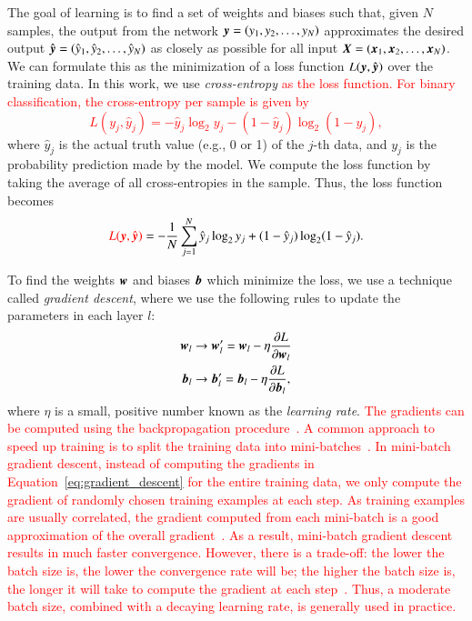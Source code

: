 \documentclass[fleqn,usenatbib]{mnras}
\newcommand{\eg}{{e.g., }}
\newcommand{\changed}[1]{\textcolor{red}{#1}}
\begin{document}
The goal of learning is to find a set of weights and biases such that,
given $N$ samples, the output from the network
$\bmath{y}=\left(y_1, y_2, \dots, y_N \right)$ approximates the desired output
$\hat{\bmath{y}}=\left(\hat{y}_1, \hat{y}_2, \dots, \hat{y}_N \right)$
as closely as possible for all input
$\bmath{X}=\left(\bmath{x}_1,\bmath{x}_2,\dots,\bmath{x}_N\right)$.
We can formulate this as the minimization of a loss function
$L(\bmath{y},\hat{\bmath{y}})$
over the training data.
In this work, we use \textit{cross-entropy}
\changed{
\citep[also called log loss;][]{murphy2012machine} as the loss function.
For binary classification, the cross-entropy per sample is given by
\begin{equation}
  L(y_j, \hat{y}_j) = -\hat{y}_j \log_2 y_j - (1 - \hat{y}_j) \log_2(1 - y_j),
  \label{eq:cross_entropy}
\end{equation}
}
where $\hat{y}_j$ is the actual truth value (\eg 0 or 1) of the $j$-th data, and
$y_j$ is the probability prediction made by the model.
We compute the loss function by taking the average of all cross-entropies in the sample.
Thus, the loss function becomes
\begin{equation}
\changed{
  L(\bmath{y}, \hat{\bmath{y}})
}
= - \frac{1}{N} \sum_{j=1}^{N} \hat{y}_j  \log_2 y_j
    + (1 - \hat{y}_j)  \log_2 (1 - \hat y_j).
  \label{eq:cross_entropy_all}
\end{equation}

To find the weights $\bmath{w}$ and biases $\bmath{b}$ which minimize the loss,
we use a technique called \textit{gradient descent},
where we use the following rules to update the parameters in each layer $l$:
\begin{align}
  \bmath{w}_l &\rightarrow
  \bmath{w}_l^{\prime}
  = \bmath{w}_l - \eta \frac{\partial L}{\partial \bmath{w}_l} \nonumber \\
  \bmath{b}_l &\rightarrow
  \bmath{b}_l^{\prime}
  = \bmath{b}_l - \eta \frac{\partial L}{\partial \bmath{b}_l},
  \label{eq:gradient_descent}
\end{align}
where $\eta$ is a small, positive number known as the \textit{learning rate}.
\changed{
The gradients can be computed using the backpropagation
procedure~\citep{rumelhart1988learning}.
A common approach to speed up training is to split the training data
into mini-batches~\citep{lecun1998efficient}.
In mini-batch gradient descent, instead of computing the gradients in
Equation~\ref{eq:gradient_descent} for the entire training data,
we only compute the gradient of randomly chosen training examples at each step.
As training examples are usually correlated,
the gradient computed from each mini-batch is a good approximation
of the overall gradient~\citep{bottou1998online}.
As a result, mini-batch gradient descent results in much faster convergence.
However, there is a trade-off: the lower the batch size is,
the lower the convergence rate will be;
the higher the batch size is, the longer it will take to compute the gradient
at each step~\citep{bousquet2008tradeoffs}.
Thus, a moderate batch size, combined with a decaying learning rate, is
generally used in practice.
}
\end{document}

